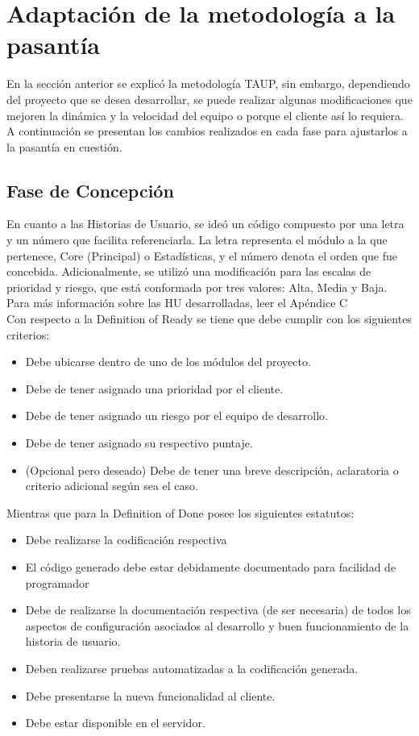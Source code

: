 \section{Adaptación de la metodología a la pasantía}

En la sección anterior se explicó la metodología TAUP, sin embargo, dependiendo del proyecto que se desea desarrollar, se puede realizar algunas modificaciones que mejoren la dinámica y la velocidad del equipo o porque el cliente así lo requiera. A continuación se presentan los cambios realizados en cada fase para ajustarlos a la pasantía en cuestión. 

\subsection{Fase de Concepción}

En cuanto a las Historias de Usuario, se ideó un código compuesto por una letra y un número que facilita referenciarla. La letra representa el módulo a la que pertenece, Core (Principal) o Estadísticas, y el número denota el orden que fue concebida. Adicionalmente, se utilizó una modificación  para las escalas de prioridad y riesgo, que está conformada por tres valores: Alta, Media y Baja. Para más información sobre las HU desarrolladas, leer el Apéndice C\\

Con respecto a la Definition of Ready se tiene que debe cumplir con los siguientes criterios:

\begin{itemize}
    \item Debe ubicarse dentro de uno de los módulos del proyecto.
    \item Debe de tener asignado una prioridad por el cliente.
    \item Debe de tener asignado un riesgo por el equipo de desarrollo.
    \item Debe de tener asignado su respectivo puntaje.
    \item (Opcional pero deseado) Debe de tener una breve descripción, aclaratoria o criterio adicional según sea el caso.
\end{itemize}

Mientras que para la Definition of Done posee los siguientes estatutos:

\begin{itemize}
    \item Debe realizarse la codificación respectiva
    \item El código generado debe estar debidamente documentado para facilidad de programador
    \item Debe de realizarse la documentación respectiva (de ser necesaria) de todos los aspectos de configuración asociados al desarrollo y buen funcionamiento de la historia de usuario.
    \item Deben realizarse pruebas automatizadas a la codificación generada.
    \item Debe presentarse la nueva funcionalidad al cliente.
    \item Debe estar disponible en el servidor.
\end{itemize}

